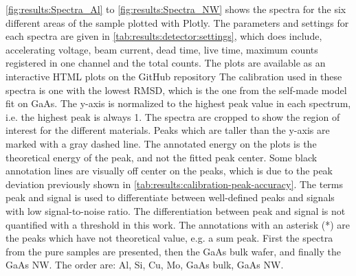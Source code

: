 \cref{fig:results:Spectra_Al} to \cref{fig:results:Spectra_NW} shows the spectra for the six different areas of the sample plotted with Plotly.
The parameters and settings for each spectra are given in \cref{tab:results:detector:settings}, which does include, accelerating voltage, beam current, dead time, live time, maximum counts registered in one channel and the total counts.
The plots are available as an interactive HTML plots on the GitHub repository
The calibration used in these spectra is one with the lowest RMSD, which is the one from the self-made model fit on GaAs.
The y-axis is normalized to the highest peak value in each spectrum, i.e. the highest peak is always 1.
The spectra are cropped to show the region of interest for the different materials.
Peaks which are taller than the y-axis are marked with a gray dashed line.
The annotated energy on the plots is the theoretical energy of the peak, and not the fitted peak center.
Some black annotation lines are visually off center on the peaks, which is due to the peak deviation previously shown in \cref{tab:results:calibration-peak-accuracy}.
The terms peak and signal is used to differentiate between well-defined peaks and signals with low signal-to-noise ratio.
The differentiation between peak and signal is not quantified with a threshold in this work. %
The annotations with an asterisk (*) are the peaks which have not theoretical value, e.g. a sum peak.
First the spectra from the pure samples are presented, then the GaAs bulk wafer, and finally the GaAs NW.
The order are: Al, Si, Cu, Mo, GaAs bulk, GaAs NW.




